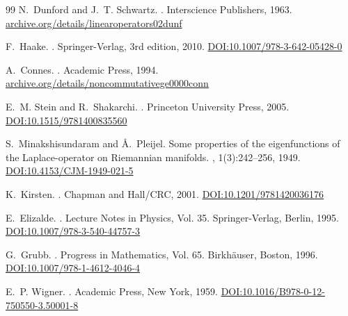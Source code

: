 \documentclass{article}
\numberwithin{equation}{section}
\theoremstyle{plain}
\theoremstyle{definition}
\theoremstyle{remark}
\begin{document}
\begin{thebibliography}{99}
N.~Dunford and J.~T. Schwartz.
.
\newblock Interscience Publishers, 1963.
\href{https://archive.org/details/linearoperators02dunf}{archive.org/details/linearoperators02dunf}

F.~Haake.
.
\newblock Springer-Verlag, 3rd edition, 2010.
\href{https://doi.org/10.1007/978-3-642-05428-0}{DOI:10.1007/978-3-642-05428-0}

A.~Connes.
.
\newblock Academic Press, 1994.
\href{https://archive.org/details/noncommutativege0000conn}{archive.org/details/noncommutativege0000conn}


E.~M. Stein and R.~Shakarchi.
.
\newblock Princeton University Press, 2005.
\href{https://doi.org/10.1515/9781400835560}{DOI:10.1515/9781400835560}

S.~Minakshisundaram and {\AA}.~Pleijel.
\newblock Some properties of the eigenfunctions of the Laplace-operator on Riemannian manifolds.
, 1(3):242--256, 1949.
\href{https://doi.org/10.4153/CJM-1949-021-5}{DOI:10.4153/CJM-1949-021-5}

K.~Kirsten.
.
\newblock Chapman and Hall/CRC, 2001.
\href{https://doi.org/10.1201/9781420036176}{DOI:10.1201/9781420036176}

E.~Elizalde.
.
\newblock Lecture Notes in Physics, Vol. 35. Springer-Verlag, Berlin, 1995.
\href{https://doi.org/10.1007/978-3-540-44757-3}{DOI:10.1007/978-3-540-44757-3}

G.~Grubb.
.
\newblock Progress in Mathematics, Vol. 65. Birkh{\"a}user, Boston, 1996.
\href{https://doi.org/10.1007/978-1-4612-4046-4}{DOI:10.1007/978-1-4612-4046-4}

E.~P. Wigner.
.
\newblock Academic Press, New York, 1959.
\href{https://doi.org/10.1016/B978-0-12-750550-3.50001-8}{DOI:10.1016/B978-0-12-750550-3.50001-8}


\end{thebibliography}
\end{document}
